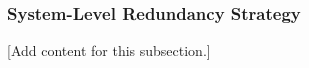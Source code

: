 
\subsubsection{System-Level Redundancy Strategy}
\label{subsubsec:design_2_5_system_redundancy_strategy}

[Add content for this subsection.]
